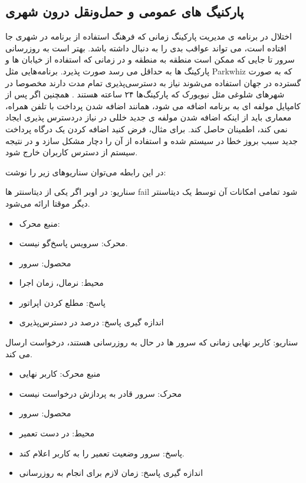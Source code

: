 \subsection{پارکنیگ های عمومی و حمل‌و‌نقل درون شهری}
اختلال در برنامه ی مدیریت پارکینگ زمانی که فرهنگ استفاده از برنامه در شهری جا افتاده است، می تواند عواقب بدی را به دنبال داشته باشد. بهتر است به روزرسانی سرور تا جایی که ممکن است منطقه به منطقه و در زمانی که استفاده از خیابان ها و پارکینگ ها به حداقل می رسد صورت پذیرد.
برنامه‌هایی مثل Parkwhiz که به صورت گسترده در جهان استفاده می‌شوند نیاز به دسترسی‌پذیری تمام مدت دارند مخصوصا در شهر‌های شلوغی مثل نیویورک که پارکینگ‌ها ۲۴ ساعته هستند \cite{parkwhiz_availability} .
همچنین اگر پس از کامپایل مولفه ای به برنامه اضافه می شود، همانند اضافه شدن پرداخت با تلفن همراه، معماری باید از اینکه اضافه شدن مولفه ی جدید خللی در نیاز دردسترس پذیری ایجاد نمی کند، اطمینان حاصل کند. برای مثال، فرض کنید اضافه کردن یک درگاه پرداخت جدید سبب بروز خطا در سیستم شده و استفاده از آن را دچار مشکل سازد و در نتیجه سیستم از دسترس کاربران خارج شود.


در این رابطه می‌توان سناریو‌های زیر را نوشت:

سناریو: در اوبر اگر یکی از دیتاسنتر ها fail شود تمامی امکانات آن توسط یک دیتاسنتر دیگر موقتا ارائه می‌شود.
\begin{itemize}
\item
منبع محرک: 
\item
محرک: سرویس پاسخ‌گو نیست.
\item
محصول: سرور 
\item
محیط: نرمال، زمان اجرا
\item
پاسخ: مطلع کردن اپراتور
\item
اندازه گیری پاسخ: درصد در دسترس‌پذیری
\end{itemize}

سناریو: کاربر نهایی زمانی که سرور ها در حال به روزرسانی هستند، درخواست ارسال می کند.
\begin{itemize}
\item
منبع محرک: کاربر نهایی
\item
محرک: سرور قادر به پردازش درخواست نیست
\item
محصول: سرور
\item
محیط: در دست تعمیر
\item
پاسخ: سرور وضعیت تعمیر را به کاربر اعلام کند.
\item
اندازه گیری پاسخ: زمان لازم برای انجام به روز‌رسانی
\end{itemize}





